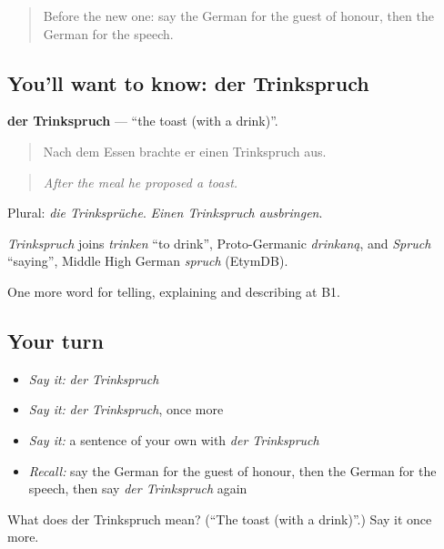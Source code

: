 \label{lesson:GE-C307-trinkspruch}



\begin{quote}
Before the new one: say the German for the guest of honour, then the German for the speech.
\end{quote}

\subsection*{You'll want to know: der Trinkspruch}
\textbf{der Trinkspruch} — \textquotedblleft{}the toast (with a drink)\textquotedblright{}.

\begin{quote}
Nach dem Essen brachte er einen Trinkspruch aus.
\end{quote}

\begin{quote}
\emph{After the meal he proposed a toast.}
\end{quote}

Plural: \emph{die Trinksprüche}. \emph{Einen Trinkspruch ausbringen}.

\begin{cousinweb}
\emph{Trinkspruch} joins \emph{trinken} \textquotedblleft{}to drink\textquotedblright{}, Proto-Germanic \emph{drinkaną}, and \emph{Spruch} \textquotedblleft{}saying\textquotedblright{}, Middle High German \emph{spruch} (EtymDB).
\end{cousinweb}

\begin{grammarlens}[title={What you've built}]
One more word for telling, explaining and describing at B1.
\end{grammarlens}

\subsection*{Your turn}
\begin{itemize}
\raggedright
  \item \emph{Say it:} \emph{der Trinkspruch}
  \item \emph{Say it:} \emph{der Trinkspruch}, once more
  \item \emph{Say it:} a sentence of your own with \emph{der Trinkspruch}
  \item \emph{Recall:} say the German for the guest of honour, then the German for the speech, then say \emph{der Trinkspruch} again
\end{itemize}

\begin{tcolorbox}[breakable,colback=teal!4,colframe=teal!35!black,title={Before you move on}]
What does der Trinkspruch mean? (\textquotedblleft{}The toast (with a drink)\textquotedblright{}.) Say it once more.
\end{tcolorbox}
